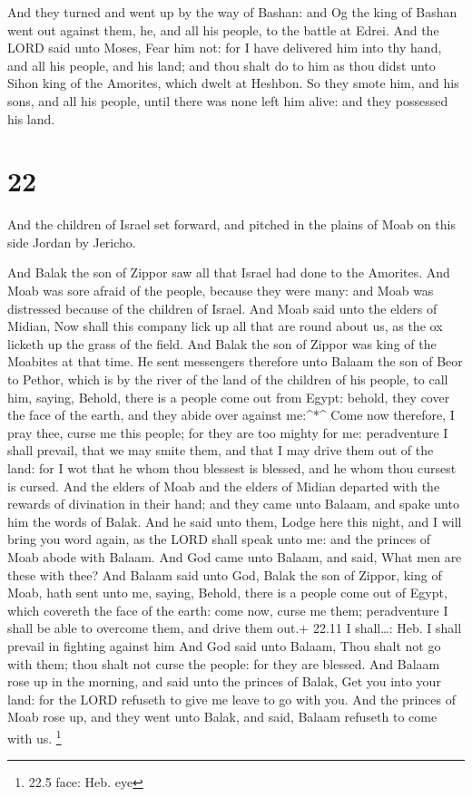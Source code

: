 And they turned and went up by the way of Bashan: and Og
the king of Bashan went out against them, he, and all his people, to the
battle at Edrei.  And the LORD said unto Moses, Fear him
not: for I have delivered him into thy hand, and all his people, and his
land; and thou shalt do to him as thou didst unto Sihon king of the
Amorites, which dwelt at Heshbon.  So they smote him, and
his sons, and all his people, until there was none left him alive: and
they possessed his land.

\hypertarget{section-21}{%
\section{22}\label{section-21}}

 And the children of Israel set forward, and pitched in the
plains of Moab on this side Jordan by Jericho.

 And Balak the son of Zippor saw all that Israel had done to
the Amorites.  And Moab was sore afraid of the people,
because they were many: and Moab was distressed because of the children
of Israel.  And Moab said unto the elders of Midian, Now
shall this company lick up all that are round about us, as the ox
licketh up the grass of the field. And Balak the son of Zippor was king
of the Moabites at that time.  He sent messengers therefore
unto Balaam the son of Beor to Pethor, which is by the river of the land
of the children of his people, to call him, saying, Behold, there is a
people come out from Egypt: behold, they cover the face of the earth,
and they abide over against me:\^{}*\^{}  Come now
therefore, I pray thee, curse me this people; for they are too mighty
for me: peradventure I shall prevail, that we may smite them, and that I
may drive them out of the land: for I wot that he whom thou blessest is
blessed, and he whom thou cursest is cursed.  And the elders
of Moab and the elders of Midian departed with the rewards of divination
in their hand; and they came unto Balaam, and spake unto him the words
of Balak.  And he said unto them, Lodge here this night, and
I will bring you word again, as the LORD shall speak unto me: and the
princes of Moab abode with Balaam.  And God came unto
Balaam, and said, What men are these with thee?  And Balaam
said unto God, Balak the son of Zippor, king of Moab, hath sent unto me,
saying,  Behold, there is a people come out of Egypt, which
covereth the face of the earth: come now, curse me them; peradventure I
shall be able to overcome them, and drive them out.+ 22.11 I
shall\ldots: Heb. I shall prevail in fighting against him 
And God said unto Balaam, Thou shalt not go with them; thou shalt not
curse the people: for they are blessed.  And Balaam rose up
in the morning, and said unto the princes of Balak, Get you into your
land: for the LORD refuseth to give me leave to go with you.
 And the princes of Moab rose up, and they went unto Balak,
and said, Balaam refuseth to come with us. \footnote{22.5 face: Heb. eye}


